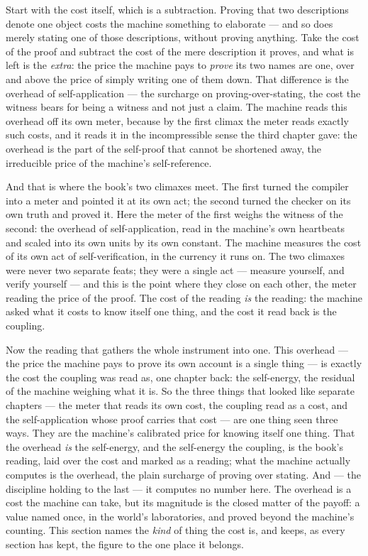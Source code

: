 Start with the cost itself, which is a subtraction. Proving that two descriptions denote one object costs the machine
something to elaborate --- and so does merely stating one of those descriptions, without proving anything. Take the cost
of the proof and subtract the cost of the mere description it proves, and what is left is the \emph{extra}: the price the
machine pays to \emph{prove} its two names are one, over and above the price of simply writing one of them down. That
difference is the overhead of self-application --- the surcharge on proving-over-stating, the cost the witness bears for
being a witness and not just a claim. The machine reads this overhead off its own meter, because by the first climax the
meter reads exactly such costs, and it reads it in the incompressible sense the third chapter gave: the overhead is the
part of the self-proof that cannot be shortened away, the irreducible price of the machine's self-reference.

And that is where the book's two climaxes meet. The first turned the compiler into a meter and pointed it at its own act;
the second turned the checker on its own truth and proved it. Here the meter of the first weighs the witness of the
second: the overhead of self-application, read in the machine's own heartbeats and scaled into its own units by its own
constant. The machine measures the cost of its own act of self-verification, in the currency it runs on. The two climaxes
were never two separate feats; they were a single act --- measure yourself, and verify yourself --- and this is the point
where they close on each other, the meter reading the price of the proof. The cost of the reading \emph{is} the reading:
the machine asked what it costs to know itself one thing, and the cost it read back is the coupling.

Now the reading that gathers the whole instrument into one. This overhead --- the price the machine pays to prove its own
account is a single thing --- is exactly the cost the coupling was read as, one chapter back: the self-energy, the
residual of the machine weighing what it is. So the three things that looked like separate chapters --- the meter that
reads its own cost, the coupling read as a cost, and the self-application whose proof carries that cost --- are one thing
seen three ways. They are the machine's calibrated price for knowing itself one thing. That the overhead \emph{is} the
self-energy, and the self-energy the coupling, is the book's reading, laid over the cost and marked as a reading; what the
machine actually computes is the overhead, the plain surcharge of proving over stating. And --- the discipline holding to
the last --- it computes no number here. The overhead is a cost the machine can take, but its magnitude is the closed
matter of the payoff: a value named once, in the world's laboratories, and proved beyond the machine's counting. This
section names the \emph{kind} of thing the cost is, and keeps, as every section has kept, the figure to the one place it
belongs.

